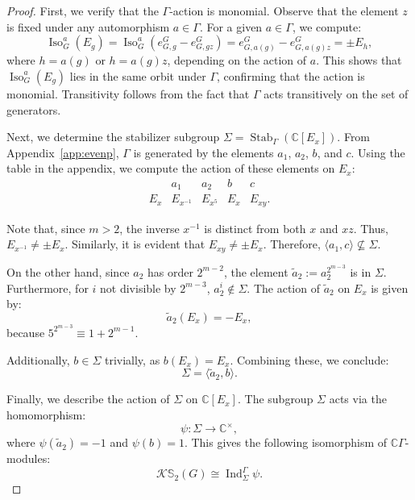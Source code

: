 \documentclass[12pt]{article}
\theoremstyle{plain}
\theoremstyle{definition}
\newcommand{\kerlint}{\mathbb S_2}
\newcommand{\iso}{\operatorname{Iso}}
\begin{document}
\begin{proof}
First, we verify that the \(\Gamma\)-action is monomial. Observe that the element \(z\) is fixed under any automorphism \(a \in \Gamma\). For a given \(a \in \Gamma\), we compute:
\[
\iso_G^a(E_g) = \iso_G^a(e_{G, g}^G - e_{G, gz}^G) 
= e_{G, a(g)}^G - e_{G, a(g)z}^G = \pm E_h,
\]
where \(h = a(g)\) or \(h = a(g)z\), depending on the action of \(a\). This shows that \(\iso_G^a(E_g)\) lies in the same orbit under \(\Gamma\), confirming that the action is monomial. Transitivity follows from the fact that \(\Gamma\) acts transitively on the set of generators.

Next, we determine the stabilizer subgroup \(\Sigma = \operatorname{Stab}_\Gamma(\mathbb{C} [E_x])\). From Appendix~\ref{app:evenp}, \(\Gamma\) is generated by the elements \(a_1\), \(a_2\), \(b\), and \(c\). Using the table in the appendix, we compute the action of these elements on \(E_x\):
\[
\begin{array}{c|cccc}
 & a_1 & a_2 & b & c \\ \hline
E_x & E_{x^{-1}} & E_{x^5} & E_x & E_{xy}.
\end{array}
\]

Note that, since \(m > 2\), the inverse \(x^{-1}\) is distinct from both \(x\) and \(xz\). Thus, \(E_{x^{-1}} \neq \pm E_x\). Similarly, it is evident that \(E_{xy} \neq \pm E_x\). Therefore, \(\langle a_1, c \rangle \not\subseteq \Sigma\).

On the other hand, since \(a_2\) has order \(2^{m-2}\), the element \(\tilde{a}_2 := a_2^{2^{m-3}}\) is in \(\Sigma\). Furthermore, for \(i\) not divisible by \(2^{m-3}\), \(a_2^i \notin \Sigma\). The action of \(\tilde{a}_2\) on \(E_x\) is given by:
\[
\tilde{a}_2(E_x) = -E_x,
\]
because \(5^{2^{m-3}} \equiv 1 + 2^{m-1}\).

Additionally, \(b \in \Sigma\) trivially, as \(b(E_x) = E_x\). Combining these, we conclude:
\[
\Sigma = \langle \tilde{a}_2, b \rangle.
\]

Finally, we describe the action of \(\Sigma\) on \(\mathbb{C} [E_x]\). The subgroup \(\Sigma\) acts via the homomorphism:
\[
\psi: \Sigma \to \mathbb{C}^\times,
\]
where \(\psi(\tilde{a}_2) = -1\) and \(\psi(b) = 1\). This gives the following isomorphism of \(\mathbb{C}\Gamma\)-modules:
\[
\mathcal{K}\kerlint(G) \cong \operatorname{Ind}_\Sigma^\Gamma \psi.
\]
\end{proof}
\end{document}
